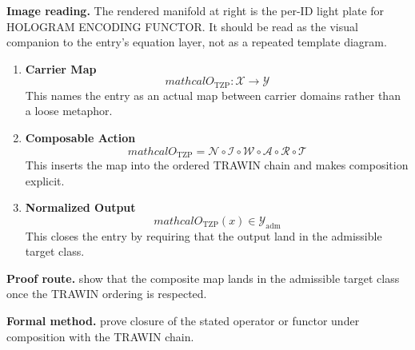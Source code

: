 \begin{samepage}
\noindent\begin{minipage}[t]{0.45\linewidth}
\vspace{0pt}
\raggedright
\scriptsize\textbf{Image reading.} The rendered manifold at right is the per-ID light plate for HOLOGRAM ENCODING FUNCTOR. It should be read as the visual companion to the entry's equation layer, not as a repeated template diagram.\par
\end{minipage}\hfill
\begin{minipage}[t]{0.53\linewidth}
\vspace*{-0.10in}
\raggedright
{}
\end{minipage}
\end{samepage}

\clearpage


\begin{enumerate}[leftmargin=1.6em,itemsep=9pt,topsep=6pt]
\item \textbf{Carrier Map}
\[
mathcal{O}_{\mathrm{TZP}} : \mathcal{X} \to \mathcal{Y}
\]
This names the entry as an actual map between carrier domains rather than a loose metaphor.

\item \textbf{Composable Action}
\[
mathcal{O}_{\mathrm{TZP}} = \mathcal{N}\circ \mathcal{I}\circ \mathcal{W}\circ \mathcal{A}\circ \mathcal{R}\circ \mathcal{T}
\]
This inserts the map into the ordered TRAWIN chain and makes composition explicit.

\item \textbf{Normalized Output}
\[
mathcal{O}_{\mathrm{TZP}}(x) \in \mathcal{Y}_{\mathrm{adm}}
\]
This closes the entry by requiring that the output land in the admissible target class.
\end{enumerate}

\textbf{Proof route.} show that the composite map lands in the admissible target class once the TRAWIN ordering is respected.

\textbf{Formal method.} prove closure of the stated operator or functor under composition with the TRAWIN chain.

\medskip
{}

